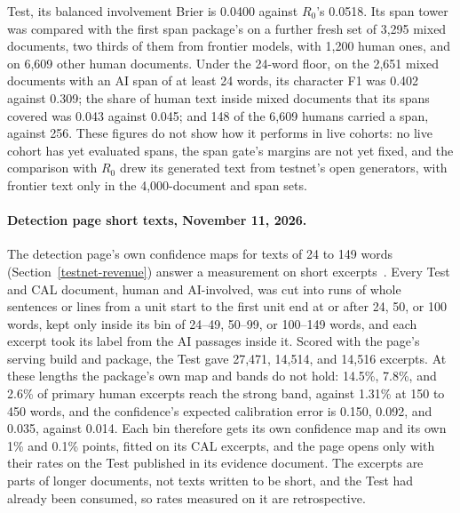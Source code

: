 Test, its balanced involvement Brier is 0.0400 against \(R_0\)'s 0.0518. Its
span tower was compared with the first span package's on a further fresh set of
3,295 mixed documents, two thirds of them from frontier models, with 1,200
human ones, and on 6,609 other human documents. Under the 24-word floor, on the
2,651 mixed documents with an AI span of at least 24 words, its character F1
was 0.402 against 0.309; the share of human text inside mixed documents that
its spans covered was 0.043 against 0.045; and 148 of the 6,609 humans carried
a span, against 256. These figures do not show how it performs in live
cohorts: no live cohort has yet evaluated spans, the span gate's
margins are not yet fixed, and the comparison with \(R_0\) drew its generated
text from testnet's open generators, with frontier text only in the
4,000-document and span sets.

\paragraph{Detection page short texts, November 11, 2026.}\label{short-text-evidence}
The detection page's own confidence maps for texts of 24 to 149 words
(Section~\ref{testnet-revenue}) answer a measurement on short
excerpts~\cite{detectevidence}. Every Test and CAL document, human and
AI-involved, was cut into runs of whole sentences or lines from a unit start
to the first unit end at or after 24, 50, or 100 words, kept only inside its
bin of 24--49, 50--99, or 100--149 words, and each excerpt took its label from
the AI passages inside it. Scored with the page's serving build and package,
the Test gave 27,471, 14,514, and 14,516 excerpts. At these lengths the
package's own map and bands do not hold: 14.5\%, 7.8\%, and 2.6\% of primary
human excerpts reach the strong band, against 1.31\% at 150 to 450 words, and
the confidence's expected calibration error is 0.150, 0.092, and 0.035,
against 0.014. Each bin therefore gets its own confidence map and its own 1\%
and 0.1\% points, fitted on its CAL excerpts, and the page opens only with
their rates on the Test published in its evidence document. The excerpts are
parts of longer documents, not texts written to be short, and the Test had
already been consumed, so rates measured on it are retrospective.

